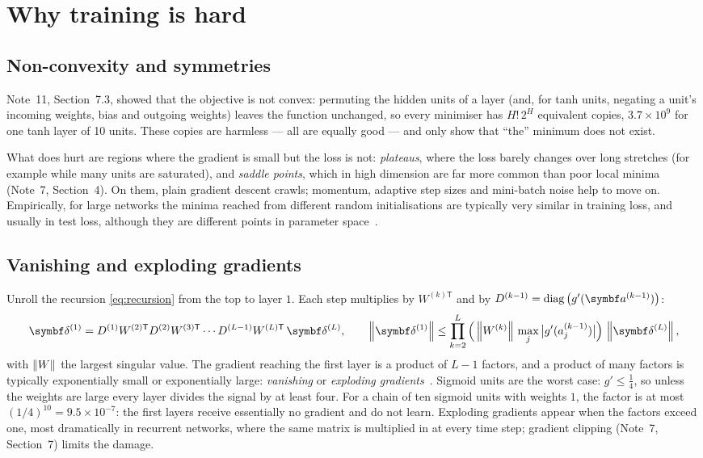 \documentclass[11pt]{article}
\newcommand{\av}{\vect{a}}
\newcommand{\dv}{\vect{\delta}}
\newcommand{\diag}{\operatorname{diag}}
\begin{document}
\section{Why training is hard}\label{sec:hard}

\subsection{Non-convexity and symmetries}\label{sec:nonconvex}

Note~11, Section~7.3, showed that the objective is not convex: permuting the hidden units of a layer (and, for tanh
units, negating a unit's incoming weights, bias and outgoing weights) leaves the function unchanged, so every minimiser
has $H!\,2^H$ equivalent copies, $3.7 \times 10^9$ for one tanh layer of 10 units. These copies are harmless --- all are
equally good --- and only show that ``the'' minimum does not exist.

What does hurt are regions where the gradient is small but the loss is not: \emph{plateaus}, where the loss barely
changes over long stretches (for example while many units are saturated), and \emph{saddle points}, which in high
dimension are far more common than poor local minima~\cite{dauphin2014} (Note~7, Section~4). On them, plain gradient
descent crawls; momentum, adaptive step sizes and mini-batch noise help to move on. Empirically, for large networks
the minima reached from different random initialisations are typically very similar in training loss, and usually in
test loss, although they are different points in parameter space~\cite[Section~8.2]{goodfellow2016}.

\subsection{Vanishing and exploding gradients}\label{sec:vanishing}

Unroll the recursion \eqref{eq:recursion} from the top to layer $1$. Each step multiplies by $W^{(k)\mathsf{T}}$ and by
$D^{(k-1)} = \diag\big(g'(\av^{(k-1)})\big)$:
\begin{equation}\label{eq:product}
  \dv^{(1)} = D^{(1)}W^{(2)\mathsf{T}}D^{(2)}W^{(3)\mathsf{T}}\cdots D^{(L-1)}W^{(L)\mathsf{T}}\,\dv^{(L)} ,
  \qquad
  \norm{\dv^{(1)}} \le \prod_{k=2}^{L}\Big(\norm{W^{(k)}}\,\max_j\big|g'(a^{(k-1)}_j)\big|\Big)\,\norm{\dv^{(L)}} ,
\end{equation}
with $\left\lVert W \right\rVert$ the largest singular value. The gradient reaching the first layer is a product of $L - 1$ factors, and a
product of many factors is typically exponentially small or exponentially large: \emph{vanishing} or \emph{exploding
gradients}~\cite{bengio1994}. Sigmoid units are the worst case: $g' \le \frac14$, so unless the weights are large every
layer divides the signal by at least four. For a chain of ten sigmoid units with weights $1$, the factor is at most
$(1/4)^{10} = 9.5 \times 10^{-7}$: the first layers receive essentially no gradient and do not learn. Exploding
gradients appear when the factors exceed one, most dramatically in recurrent networks, where the same matrix is
multiplied in at every time step; gradient clipping (Note~7, Section~7) limits the damage.
\end{document}

